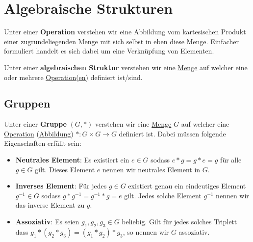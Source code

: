 \documentclass[../../main.tex]{subfiles}
\begin{document}
	
	\chapter{Algebraische Strukturen}
	
		\begin{definition}[Operation]
			\label{def:Operation}
			Unter einer \textbf{Operation} verstehen wir eine Abbildung vom kartesischen Produkt einer zugrundeliegenden Menge mit sich selbst in eben diese Menge. Einfacher formuliert handelt es sich dabei um eine Verknüpfung von Elementen. 
		\end{definition}
	
		\begin{definition}
			\label{def:AlgebraischeStrutur}
			Unter einer \textbf{algebraischen Struktur} verstehen wir eine \hyperref[def:Menge]{Menge} auf welcher eine oder mehrere \hyperref[def:Operation]{Operation(en)} definiert ist/sind.
		\end{definition}
	
		\section{Gruppen}
	
		\begin{definition}
			\label{def:Gruppe}
			\label{def:neutralesElement}
			\label{def:inversesElement}
			\label{def:assoziativ}
			Unter einer \textbf{Gruppe} $(G,*)$ verstehen wir eine \hyperref[def:Menge]{Menge} $G$ auf welcher eine \hyperref[def:Operation]{Operation} (\hyperref[def:Abbildung]{Abbildung}) $*: G \times G \rightarrow G$ definiert ist. Dabei müssen folgende Eigenschaften erfüllt sein:
			\begin{itemize}
				\item \textbf{Neutrales Element}: Es existiert ein $e \in G$ sodass $e * g = g * e = g$ für alle $g\in G$ gilt. Dieses Element $e$ nennen wir neutrales Element in $G$.
				\item \textbf{Inverses Element}: Für jedes $g \in G$ existiert genau ein eindeutiges Element $g^{-1} \in G$ sodass $g * g^{-1} = g^{-1} * g = e$ gilt. Jedes solche Element $g^{-1}$ nennen wir das inverse Element zu $g$.
				\item \textbf{Assoziativ}: Es seien $g_1, g_2,g_3 \in G$ beliebig. Gilt für jedes solches Triplett dass $g_1 * (g_2 * g_3) = (g_1 * g_2) * g_3$, so nennen wir $G$ assoziativ. 
			\end{itemize}
		\end{definition}
	
\end{document}
